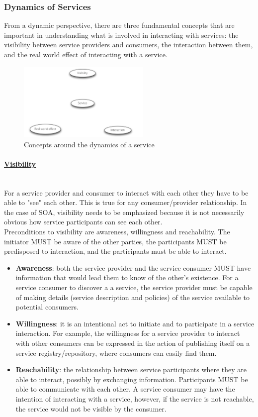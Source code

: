 \documentclass[10pt,a4paper]{article}
\newcommand{\myparagraph}[1]{\paragraph{\uline{#1}}\mbox{}\\[0.05in]}
\begin{document}
\subsubsection{Dynamics of Services}
From a dynamic perspective, there are three fundamental concepts that are important in understanding what is involved in interacting with services: the visibility between service providers and consumers, the interaction between them, and the real world effect of interacting with a service.
\begin{figure}[h!]
 \hfill \includegraphics[width=180pt]{images/dynamics-services}\hspace*{\fill}
  \caption{Concepts around the dynamics of a service}
  \label{fig:dynamics}
\end{figure} 
\myparagraph{Visibility}
 For a service provider and consumer to interact with each other they have to be able to "see" each other. This is true for any consumer/provider relationship. In the case of SOA, visibility needs to be emphasized because it is not necessarily obvious how service participants can see each other. \\
 Preconditions to visibility are awareness, willingness and reachability. The initiator MUST be aware of the other parties, the participants MUST be predisposed to interaction, and the participants must be able to interact.
 \begin{itemize}
 	\item \textbf{Awareness}: both the service provider and the service consumer MUST have information that would lead them to know of the other's existence. For a service consumer to discover a a service, the service provider must be capable of making details (service description and policies) of the service available to potential consumers.
 	\item \textbf{Willingness}: it is an intentional act to initiate and to participate in a service interaction.  For example, the willingness for a service provider to interact with other consumers can be expressed in the action of publishing itself on a service registry/repository, where consumers can easily find them.
 	\item \textbf{Reachability}: the relationship between service participants where they are able to interact, possibly by exchanging information. Participants MUST be able to communicate with each other. A service consumer may have the intention of interacting with a service, however, if the service is not reachable, the service would not be visible by the consumer.
 \end{itemize}
\end{document}
